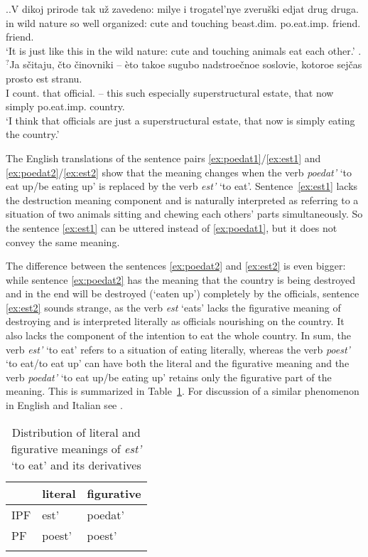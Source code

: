\ex.\ag.\label{ex:est1}V dikoj prirode tak u\v{z} zavedeno: milye i trogatel'nye zveru\v{s}ki edjat drug druga.\\
in wild nature so well organized: cute and touching beast.dim. po.eat.imp. friend. friend.\\
\trans `It is just like this in the wild nature: cute and touching animals eat each other.'
\bg.$^?$Ja s\v{c}itaju, \v{c}to \v{c}inovniki -- \`{e}to takoe sugubo nadstroe\v{c}noe soslovie, kotoroe sej\v{c}as prosto est stranu.\label{ex:est2}\\
I count. that official. -- this such especially superstructural estate, that now simply po.eat.imp. country.\\
\trans `I think that officials are just a superstructural estate, that now is simply eating the country.'

The English translations of the sentence pairs \ref{ex:poedat1}/\ref{ex:est1} and \ref{ex:poedat2}/\ref{ex:est2} show that  the meaning changes when the verb \textit{poedat'} `to eat up/be eating up' is replaced by the verb \textit{est'} `to eat'. Sentence~\ref{ex:est1} lacks the destruction meaning component and is naturally interpreted as referring to a situation of two animals sitting and chewing each others' parts simultaneously. So the sentence \ref{ex:est1} can be uttered instead of \ref{ex:poedat1}, but it does not convey the same meaning.

The difference between the sentences \ref{ex:poedat2} and \ref{ex:est2} is even bigger: while sentence \ref{ex:poedat2} has the meaning that the country is being destroyed and in the end will be destroyed (`eaten up') completely by the officials, sentence \ref{ex:est2} sounds strange, as the verb \textit{est} `eats' lacks the figurative meaning of destroying and is interpreted literally as officials nourishing on the country. It also lacks the component of the intention to eat the whole country. In sum, the verb \textit{est'} `to eat' refers to a situation of eating literally, whereas the verb \textit{poest'} `to eat/to eat up' can have both the literal and the figurative meaning and the verb \textit{poedat'} `to eat up/be eating up' retains only the figurative part of the meaning. This is summarized in Table~\ref{table:eat}. For discussion of a similar phenomenon in English and Italian see \citet{FolliHarley:05}.

\begin{table}
\caption{Distribution of literal and figurative meanings of \textit{est'} `to eat' and its derivatives \label{table:eat}}
\begin{tabular}{lll}
\lsptoprule
& literal & figurative \\ \midrule
IPF & est' & poedat' \\
PF & poest' & poest' \\ \lspbottomrule
\end{tabular}
\end{table}

